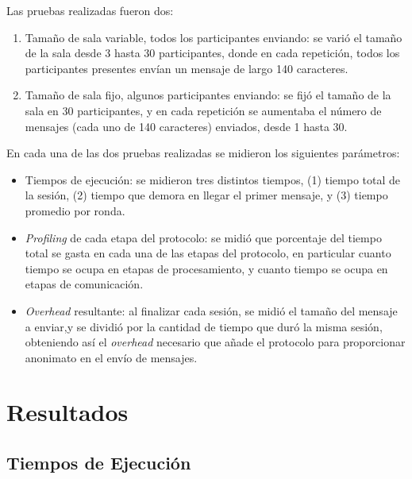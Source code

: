 Las pruebas realizadas fueron dos:

\begin{enumerate}
	\item Tamaño de sala variable, todos los participantes enviando: se 
	varió el tamaño de la sala desde 3 hasta 30 participantes, donde en 
	cada repetición, todos los participantes presentes envían un 
	mensaje de largo 140 caracteres.
	\item Tamaño de sala fijo, algunos participantes enviando: se fijó 
	el tamaño de la sala en 30 participantes, y en cada repetición se 
	aumentaba el número de mensajes (cada uno de 140 caracteres) enviados, 
	desde 1 hasta 30.
\end{enumerate}

En cada una de las dos pruebas realizadas se midieron los siguientes 
parámetros:

\begin{itemize}
	\item Tiempos de ejecución: se midieron tres distintos tiempos, (1) tiempo 
	total de la sesión, (2) tiempo que demora en llegar el primer mensaje, y 
	(3) tiempo promedio por ronda.
	\item \emph{Profiling} de cada etapa del protocolo: se midió que porcentaje 
	del tiempo total se gasta en cada una de las etapas del protocolo, en particular 
	cuanto tiempo se ocupa en etapas de procesamiento, y cuanto tiempo se ocupa 
	en etapas de comunicación.
	\item \emph{Overhead} resultante: al finalizar cada sesión, se midió el tamaño 
	del mensaje a enviar,y se dividió por la cantidad de tiempo que 
	duró la misma sesión, obteniendo así el \emph{overhead} necesario que añade
	el protocolo para proporcionar anonimato en el envío de mensajes.
\end{itemize}

\section{Resultados}

\subsection{Tiempos de Ejecución}

